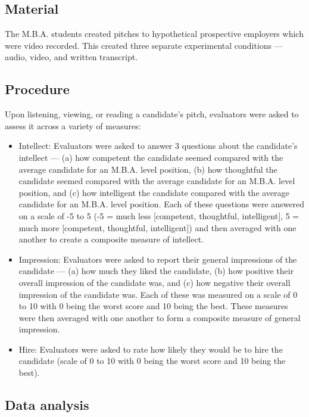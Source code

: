\documentclass[
  english,
  man]{apa6}
\begin{document}
\hypertarget{material}{%
\subsection{Material}\label{material}}

The M.B.A. students created pitches to hypothetical prospective employers which were video recorded. This created three separate experimental conditions --- audio, video, and written transcript.

\hypertarget{procedure}{%
\subsection{Procedure}\label{procedure}}

Upon listening, viewing, or reading a candidate's pitch, evaluators were asked to assess it across a variety of measures:

\begin{itemize}
\item
  Intellect: Evaluators were asked to answer 3 questions about the candidate's intellect --- (a) how competent the candidate seemed compared with the average candidate for an M.B.A. level position, (b) how thoughtful the candidate seemed compared with the average candidate for an M.B.A. level position, and (c) how intelligent the candidate compared with the average candidate for an M.B.A. level position. Each of these questions were answered on a scale of -5 to 5 (-5 = much less {[}competent, thoughtful, intelligent{]}, 5 = much more {[}competent, thoughtful, intelligent{]}) and then averaged with one another to create a composite measure of intellect.
\item
  Impression: Evaluators were asked to report their general impressions of the candidate --- (a) how much they liked the candidate, (b) how positive their overall impression of the candidate was, and (c) how negative their overall impression of the candidate was. Each of these was measured on a scale of 0 to 10 with 0 being the worst score and 10 being the best. These measures were then averaged with one another to form a composite measure of general impression.
\item
  Hire: Evaluators were asked to rate how likely they would be to hire the candidate (scale of 0 to 10 with 0 being the worst score and 10 being the best).
\end{itemize}

\hypertarget{data-analysis}{%
\subsection{Data analysis}\label{data-analysis}}
\end{document}
